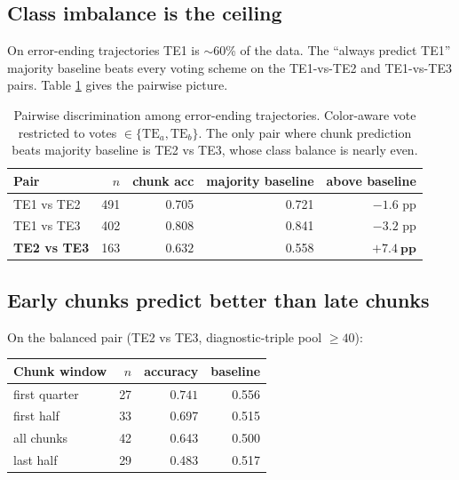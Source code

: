 \documentclass[11pt]{article}
\begin{document}
\subsection{Class imbalance is the ceiling}

On error-ending trajectories TE1 is $\sim$60\% of the data. The
``always predict TE1'' majority baseline beats every voting scheme
on the TE1-vs-TE2 and TE1-vs-TE3 pairs. Table \ref{tab:pairwise}
gives the pairwise picture.

\begin{table}[H]
\small
\centering
\caption{Pairwise discrimination among error-ending trajectories.
Color-aware vote restricted to votes $\in \{\text{TE}_a, \text{TE}_b\}$.
The only pair where chunk prediction beats majority baseline is
TE2 vs TE3, whose class balance is nearly even.}
\label{tab:pairwise}
\begin{tabular}{lrrrr}
\toprule
\textbf{Pair} & \textbf{$n$} & \textbf{chunk acc} &
  \textbf{majority baseline} & \textbf{above baseline} \\
\midrule
TE1 vs TE2   & 491 & 0.705 & 0.721 & $-1.6$ pp \\
TE1 vs TE3   & 402 & 0.808 & 0.841 & $-3.2$ pp \\
\textbf{TE2 vs TE3} & 163 & $\mathbf{0.632}$ & 0.558 & $\mathbf{+7.4\ \text{pp}}$ \\
\bottomrule
\end{tabular}
\end{table}

\subsection{Early chunks predict better than late chunks}

On the balanced pair (TE2 vs TE3, diagnostic-triple pool $\geq 40$):

\begin{center}
\begin{tabular}{lrrr}
\toprule
\textbf{Chunk window} & \textbf{$n$} & \textbf{accuracy} &
  \textbf{baseline} \\
\midrule
first quarter        & 27 & $\mathbf{0.741}$ & 0.556 \\
first half           & 33 & 0.697 & 0.515 \\
all chunks           & 42 & 0.643 & 0.500 \\
last half            & 29 & 0.483 & 0.517 \\
\bottomrule
\end{tabular}
\end{center}
\end{document}
